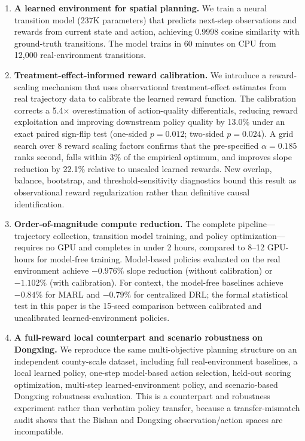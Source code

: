 \documentclass[11pt]{article}
\begin{document}
\begin{enumerate}
\item \textbf{A learned environment for spatial planning.} We train a neural transition model (237K parameters) that predicts next-step observations and rewards from current state and action, achieving 0.9998 cosine similarity with ground-truth transitions. The model trains in 60 minutes on CPU from 12{,}000 real-environment transitions.

\item \textbf{Treatment-effect-informed reward calibration.} We introduce a reward-scaling mechanism that uses observational treatment-effect estimates from real trajectory data to calibrate the learned reward function. The calibration corrects a 5.4$\times$ overestimation of action-quality differentials, reducing reward exploitation and improving downstream policy quality by 13.0\% under an exact paired sign-flip test (one-sided $p=0.012$; two-sided $p=0.024$). A grid search over 8 reward scaling factors confirms that the pre-specified $\alpha = 0.185$ ranks second, falls within 3\% of the empirical optimum, and improves slope reduction by 22.1\% relative to unscaled learned rewards. New overlap, balance, bootstrap, and threshold-sensitivity diagnostics bound this result as observational reward regularization rather than definitive causal identification.

\item \textbf{Order-of-magnitude compute reduction.} The complete pipeline---trajectory collection, transition model training, and policy optimization---requires no GPU and completes in under 2 hours, compared to 8--12 GPU-hours for model-free training. Model-based policies evaluated on the real environment achieve $-0.976\%$ slope reduction (without calibration) or $-1.102\%$ (with calibration). For context, the model-free baselines achieve $-0.84\%$ for MARL and $-0.79\%$ for centralized DRL; the formal statistical test in this paper is the 15-seed comparison between calibrated and uncalibrated learned-environment policies.

\item \textbf{A full-reward local counterpart and scenario robustness on Dongxing.} We reproduce the same multi-objective planning structure on an independent county-scale dataset, including full real-environment baselines, a local learned policy, one-step model-based action selection, held-out scoring optimization, multi-step learned-environment policy, and scenario-based Dongxing robustness evaluation. This is a counterpart and robustness experiment rather than verbatim policy transfer, because a transfer-mismatch audit shows that the Bishan and Dongxing observation/action spaces are incompatible.
\end{enumerate}
\end{document}
